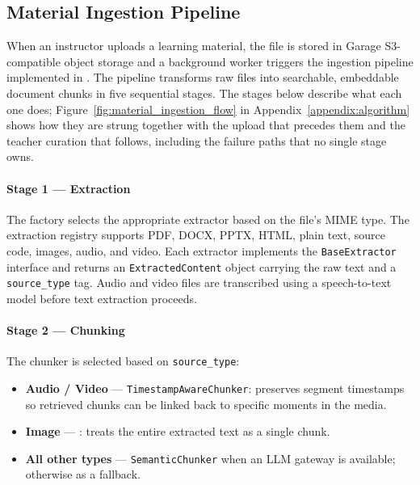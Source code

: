 \subsection{Material Ingestion Pipeline}
\label{sec:impl_ingestion}

When an instructor uploads a learning material, the file is stored in Garage S3-compatible object storage and a background worker triggers the ingestion pipeline implemented in . The pipeline transforms raw files into searchable, embeddable document chunks in five sequential stages. The stages below describe what each one does; Figure~\ref{fig:material_ingestion_flow} in Appendix~\ref{appendix:algorithm} shows how they are strung together with the upload that precedes them and the teacher curation that follows, including the failure paths that no single stage owns.

\paragraph{Stage 1 — Extraction}
The  factory selects the appropriate extractor based on the file's MIME type. The extraction registry supports PDF, DOCX, PPTX, HTML, plain text, source code, images, audio, and video. Each extractor implements the \texttt{BaseExtractor} interface and returns an \texttt{ExtractedContent} object carrying the raw text and a \texttt{source\_type} tag. Audio and video files are transcribed using a speech-to-text model before text extraction proceeds.

\paragraph{Stage 2 — Chunking}
The chunker is selected based on \texttt{source\_type}:
\begin{itemize}
    \item \textbf{Audio / Video} — \texttt{TimestampAwareChunker}: preserves segment timestamps so retrieved chunks can be linked back to specific moments in the media.
    \item \textbf{Image} — : treats the entire extracted text as a single chunk.
    \item \textbf{All other types} — \texttt{SemanticChunker} when an LLM gateway is available; otherwise  as a fallback.
\end{itemize}

